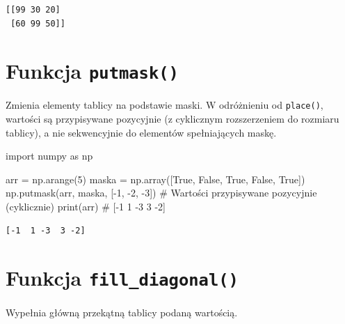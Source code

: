 \documentclass[
  polish,
  letterpaper,
  DIV=11,
  numbers=noendperiod]{scrreprt}
\newenvironment{Shaded}{\begin{snugshade}}{\end{snugshade}}
\newcommand{\BuiltInTok}[1]{\textcolor[rgb]{0.00,0.23,0.31}{#1}}
\newcommand{\CommentTok}[1]{\textcolor[rgb]{0.37,0.37,0.37}{#1}}
\newcommand{\DecValTok}[1]{\textcolor[rgb]{0.68,0.00,0.00}{#1}}
\newcommand{\ImportTok}[1]{\textcolor[rgb]{0.00,0.46,0.62}{#1}}
\newcommand{\NormalTok}[1]{\textcolor[rgb]{0.00,0.23,0.31}{#1}}
\newcommand{\OperatorTok}[1]{\textcolor[rgb]{0.37,0.37,0.37}{#1}}
\newcommand{\VariableTok}[1]{\textcolor[rgb]{0.07,0.07,0.07}{#1}}
\begin{document}
\begin{verbatim}
[[99 30 20]
 [60 99 50]]
\end{verbatim}

\section{\texorpdfstring{Funkcja
\texttt{putmask()}}{Funkcja putmask()}}\label{funkcja-putmask}

Zmienia elementy tablicy na podstawie maski. W odróżnieniu od
\texttt{place()}, wartości są przypisywane pozycyjnie (z cyklicznym
rozszerzeniem do rozmiaru tablicy), a nie sekwencyjnie do elementów
spełniających maskę.

\begin{Shaded}
\begin{Highlighting}[]
\ImportTok{import}\NormalTok{ numpy }\ImportTok{as}\NormalTok{ np}

\NormalTok{arr }\OperatorTok{=}\NormalTok{ np.arange(}\DecValTok{5}\NormalTok{)}
\NormalTok{maska }\OperatorTok{=}\NormalTok{ np.array([}\VariableTok{True}\NormalTok{, }\VariableTok{False}\NormalTok{, }\VariableTok{True}\NormalTok{, }\VariableTok{False}\NormalTok{, }\VariableTok{True}\NormalTok{])}
\NormalTok{np.putmask(arr, maska, [}\OperatorTok{{-}}\DecValTok{1}\NormalTok{, }\OperatorTok{{-}}\DecValTok{2}\NormalTok{, }\OperatorTok{{-}}\DecValTok{3}\NormalTok{])  }\CommentTok{\# Wartości przypisywane pozycyjnie (cyklicznie)}
\BuiltInTok{print}\NormalTok{(arr)  }\CommentTok{\# [{-}1  1 {-}3  3 {-}2]}
\end{Highlighting}
\end{Shaded}

\begin{verbatim}
[-1  1 -3  3 -2]
\end{verbatim}

\section{\texorpdfstring{Funkcja
\texttt{fill\_diagonal()}}{Funkcja fill\_diagonal()}}\label{funkcja-fill_diagonal}

Wypełnia główną przekątną tablicy podaną wartością.
\end{document}

